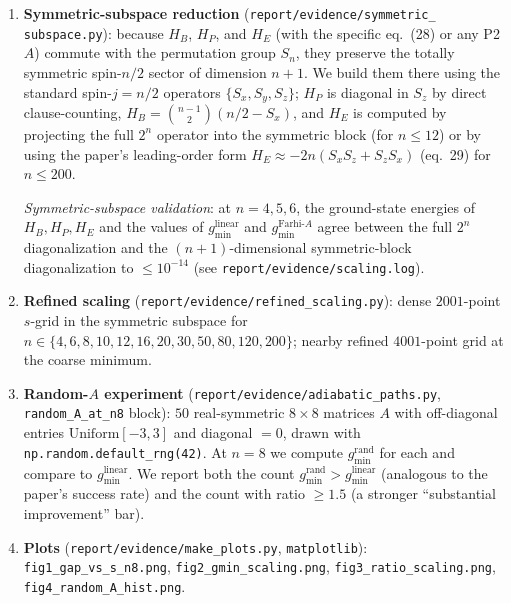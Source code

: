 \documentclass[11pt]{article}
\begin{document}
\begin{enumerate}
\item \textbf{Symmetric-subspace reduction} (\texttt{report/evidence/symmetric\_\allowbreak
      subspace.py}): because $H_B$, $H_P$, and $H_E$ (with the specific eq.\ (28) or any
      P2 $A$) commute with the permutation group $S_n$, they preserve the totally
      symmetric spin-$n/2$ sector of dimension $n+1$. We build them there using the
      standard spin-$j = n/2$ operators $\{S_x, S_y, S_z\}$; $H_P$ is diagonal in $S_z$
      by direct clause-counting, $H_B = \binom{n-1}{2} (n/2 - S_x)$, and $H_E$ is
      computed by projecting the full $2^n$ operator into the symmetric block
      (for $n \le 12$) or by using the paper's leading-order form
      $H_E \approx -2n(S_x S_z + S_z S_x)$ (eq.\ 29) for $n \le 200$.

      \emph{Symmetric-subspace validation}: at $n = 4, 5, 6$, the ground-state energies
      of $H_B, H_P, H_E$ and the values of $g_{\min}^{\text{linear}}$ and
      $g_{\min}^{\text{Farhi-}A}$ agree between the full $2^n$ diagonalization and the
      $(n+1)$-dimensional symmetric-block diagonalization to $\le 10^{-14}$
      (see \texttt{report/evidence/scaling.log}).

\item \textbf{Refined scaling} (\texttt{report/evidence/refined\_scaling.py}): dense
      $2001$-point $s$-grid in the symmetric subspace for $n \in
      \{4, 6, 8, 10, 12, 16, 20, 30, 50, 80, 120, 200\}$; nearby refined $4001$-point
      grid at the coarse minimum.

\item \textbf{Random-$A$ experiment} (\texttt{report/evidence/adiabatic\_paths.py},
      \texttt{random\_A\_at\_n8} block): $50$ real-symmetric $8\times 8$ matrices
      $A$ with off-diagonal entries $\mathrm{Uniform}[-3, 3]$ and diagonal $= 0$,
      drawn with \texttt{np.random.default\_rng(42)}. At $n = 8$ we compute
      $g_{\min}^{\text{rand}}$ for each and compare to $g_{\min}^{\text{linear}}$.
      We report both the count $g_{\min}^{\text{rand}} > g_{\min}^{\text{linear}}$
      (analogous to the paper's success rate) and the count with ratio $\ge 1.5$
      (a stronger ``substantial improvement'' bar).

\item \textbf{Plots} (\texttt{report/evidence/make\_plots.py}, \texttt{matplotlib}):
      \texttt{fig1\_gap\_vs\_s\_n8.png}, \texttt{fig2\_gmin\_scaling.png},
      \texttt{fig3\_ratio\_scaling.png}, \texttt{fig4\_random\_A\_hist.png}.
\end{enumerate}
\end{document}
